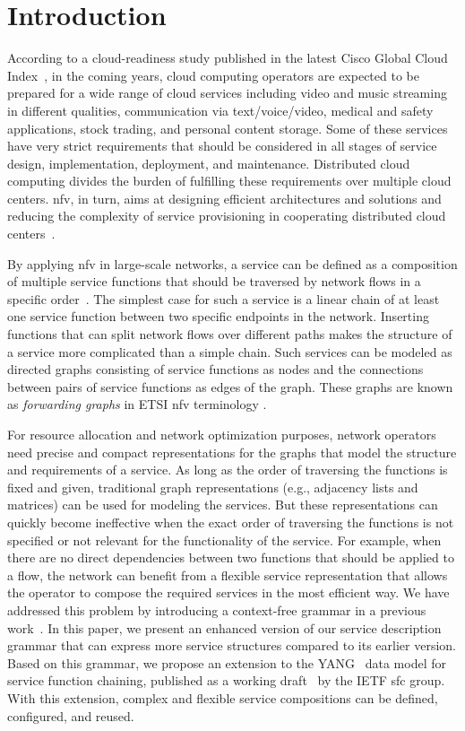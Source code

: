 \documentclass{sig-alternate-per}
\begin{document}
\section{Introduction}


According to a cloud-readiness study published in the latest Cisco Global Cloud 
Index~\cite{CiscoGCI2014}, in the coming years, cloud computing operators are expected to
be prepared for a wide range of cloud services including video and music streaming 
in different qualities, communication via text/voice/video, medical and safety 
applications, stock trading, and personal content storage. Some of these services
have very strict requirements that should be considered in all stages of service
design, implementation, deployment, and maintenance. Distributed cloud computing
divides the burden of fulfilling these requirements over multiple cloud centers.
\ac{nfv}, in turn, aims at designing efficient architectures and solutions and
reducing the complexity of service provisioning in cooperating distributed cloud 
centers~\cite{etsi-usecases}.

By applying \ac{nfv} in large-scale networks, a service can be defined as 
a composition of multiple service functions 
that should be traversed by network flows in a specific order~\cite{etsi-terminology}.
The simplest case for such a service is a linear chain of at least one service function 
between two specific endpoints in the network. Inserting functions that can split
network flows over different paths makes the structure of a service 
more complicated than a simple chain. Such services can be modeled as directed 
graphs consisting of service functions as nodes and the connections between pairs of 
service functions as edges of the graph. These graphs are known as \emph{forwarding graphs} 
in ETSI \ac{nfv} terminology \cite{etsi-terminology}.

For resource allocation and network optimization purposes, network operators need
precise and compact representations for the graphs that
model the structure and requirements of a service.  As long as the order of traversing the functions
is fixed and given, traditional graph representations (e.g., adjacency
lists and matrices) can be used for modeling the services. But these representations
can quickly become ineffective when the exact order of traversing the functions
is not specified or not relevant for the functionality of the service. For example, 
when there are no direct dependencies between two functions that should be applied
to a flow, the network can benefit from a flexible service 
representation that allows the operator to compose the required services in the 
most efficient way. We have addressed this problem by introducing a context-free
grammar in a previous work~\cite{mehraghdam2014specifying}. In this paper, 
we present an enhanced version of 
our service description grammar that can express more service structures compared 
to its earlier version. Based on this grammar, we propose an extension to the 
YANG~\cite{rfc6020} data model for service function chaining, published as a 
working draft~\cite{draft-penno-sfc-yang-11} by the IETF \ac{sfc} group. 
With this extension, complex and flexible service compositions can be defined, 
configured, and reused.
\end{document}
